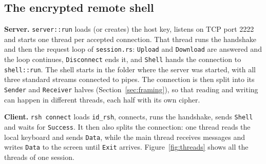 \subsection{The encrypted remote shell}
\label{sec:shellimpl}

\textbf{Server.} \texttt{server::run} loads (or creates) the host key, listens
on TCP port 2222 and starts one thread per accepted connection. That thread runs
the handshake and then the request loop of \texttt{session.rs}: \texttt{Upload}
and \texttt{Download} are answered and the loop continues, \texttt{Disconnect}
ends it, and \texttt{Shell} hands the connection to \texttt{shell::run}. The
shell starts in the folder where the server was started, with all three
standard streams connected to pipes. The connection is then split into its
\texttt{Sender} and \texttt{Receiver} halves (Section~\ref{sec:framing}), so
that reading and writing can happen in different threads, each half with its
own cipher.

\textbf{Client.} \texttt{rsh connect} loads \texttt{id\_rsh}, connects, runs the
handshake, sends \texttt{Shell} and waits for \texttt{Success}. It then also
splits the connection: one thread reads the local keyboard and sends
\texttt{Data}, while the main thread receives messages and writes \texttt{Data}
to the screen until \texttt{Exit} arrives. Figure~\ref{fig:threads} shows all
the threads of one session.

